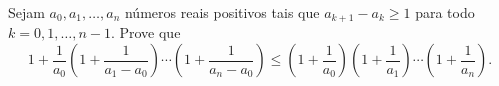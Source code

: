 Sejam \(a_0,a_1,\dots,a_n\) números reais positivos tais que \(a_{k+1}-a_k \geq 1\) para todo \(k=0,1,\dots,n-1.\) Prove que
\[
1+\frac{1}{a_0} \left( 1+\frac1{a_1-a_0}\right)\cdots\left(1+\frac1{a_n-a_0}\right)\leq \left(1+\frac1{a_0}\right) \left(1+\frac1{a_1}\right)\cdots \left(1+\frac1{a_n}\right).
\]
